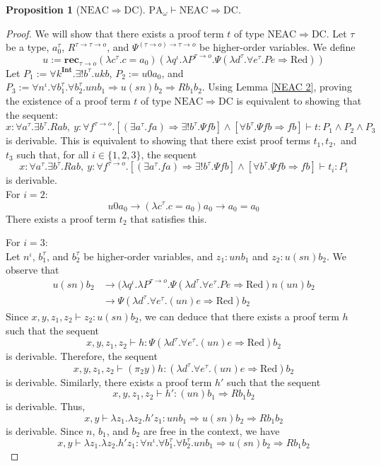 \documentclass[a4paper,12pt]{article}
\newtheorem{prop}[theo]{Proposition}
\theoremstyle{rmqstyle}
\newcommand{\PA}{\mathrm{PA}}
\renewcommand{\int}{\mathbf{Int}}
\newcommand{\rec}{\mathbf{rec}}
\renewcommand{\implies}{\Rightarrow}
\newcommand{\NEAC}{\mathrm{NEAC}}
\newcommand{\DC}{\mathrm{DC}}
\begin{document}
\begin{prop}[$\NEAC \implies \DC$]
$\PA_\omega \vdash \NEAC \implies \DC$.
\end{prop}

\begin{proof}
We will show that there exists a proof term $t$ of type $\NEAC \implies \DC$. Let $\tau$ be a type, $a_0^\tau$, $R^{\tau \to \tau \to o}$, and $\Psi^{(\tau \to o) \to \tau \to o}$ be higher-order variables. We define
$$ u := \rec_{\tau \to o} (\lambda c^\tau. c = a_0) (\lambda q^\iota. \lambda P^{\tau \to o}. \Psi (\lambda d^\tau. \forall e^\tau. P e \implies \text{Red})) $$
Let $P_1 := \forall k^\int. \exists ! b^\tau. ukb$, $P_2:= u 0 a_0$, and $P_3 := \forall n^\iota. \forall b_1^\tau. \forall b_2^\tau. u n b_1 \implies u (sn) b_2 \implies R b_1 b_2$. Using Lemma \ref{NEAC 2}, proving the existence of a proof term $t$ of type $\NEAC \implies \DC$ is equivalent to showing that the sequent:
$$ x : \forall a^\tau. \exists b^\tau. R a b, \ y : \forall f^{\tau \to o}.[( \exists a^\tau. fa) \implies \exists ! b^\tau.\Psi f b] \land [\forall b^\tau. \Psi f b \implies fb] \vdash t : P_1 \land P_2 \land P_3 $$
is derivable. This is equivalent to showing that there exist proof terms $t_1, t_2,$ and $t_3$ such that, for all $i \in \{1,2,3\}$, the sequent
$$ x : \forall a^\tau. \exists b^\tau. R a b, \ y : \forall f^{\tau \to o}.[( \exists a^\tau. fa) \implies \exists ! b^\tau.\Psi f b] \land [\forall b^\tau. \Psi f b \implies fb] \vdash t_i: P_i $$
is derivable.\\

For $i = 2$:\\
$$u 0 a_0 \longrightarrow (\lambda c^\tau. c = a_0) a_0 \longrightarrow a_0 = a_0$$
There exists a proof term $t_2$ that satisfies this.

For $i = 3$:\\
Let $n^\iota$, $b_1^\tau$, and $b_2^\tau$ be higher-order variables, and $z_1 : u n b_1$ and $z_2 : u (sn) b_2$.  We observe that
\begin{align*}
u (sn) b_2 &\longrightarrow (\lambda q^\iota. \lambda P^{\tau \to o}. \Psi (\lambda d^\tau. \forall e^\tau. P e \implies \text{Red}) n (u n) b_2\\
&\longrightarrow \Psi (\lambda d^\tau. \forall e^\tau. (un) e \implies \text{Red}) b_2
\end{align*}
Since $x,y,z_1,z_2 \vdash z_2 : u (sn) b_2$, we can deduce that there exists a proof term $h$ such that the sequent
$$ x,y,z_1,z_2 \vdash h: \Psi (\lambda d^\tau. \forall e^\tau. (un) e \implies \text{Red}) b_2 $$
is derivable. Therefore, the sequent
$$ x,y,z_1,z_2 \vdash (\pi_2 y) h: (\lambda d^\tau. \forall e^\tau. (un) e \implies \text{Red}) b_2 $$
is derivable. Similarly, there exists a proof term $h'$ such that the sequent
$$ x,y,z_1,z_2 \vdash h': (un) b_1 \implies Rb_1b_2 $$
is derivable. Thus,
$$ x,y \vdash \lambda z_1. \lambda z_2. h'z_1: unb_1 \implies u(sn)b_2\implies Rb_1b_2 $$
is derivable. Since $n$, $b_1$, and $b_2$ are free in the context, we have
$$ x,y \vdash \lambda z_1. \lambda z_2. h'z_1: \forall n^\iota. \forall b_1^\tau. \forall b_2^\tau. u n b_1 \implies u (sn) b_2 \implies Rb_1 b_2 $$


\end{proof}
\end{document}
